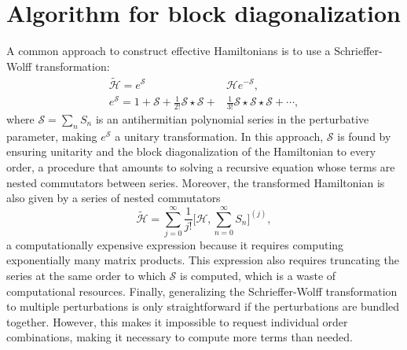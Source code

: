 \section{Algorithm for block diagonalization}

A common approach to construct effective Hamiltonians is to use a
Schrieffer-Wolff transformation:
%
\begin{align}
\tilde{\mathcal{H}} = e^\mathcal{S} &\mathcal{H} e^{-\mathcal{S}}, \\
e^{\mathcal{S}} = 1 + \mathcal{S} + \frac{1}{2!} \mathcal{S} \star \mathcal{S}
+ &\frac{1}{3!} \mathcal{S} \star \mathcal{S} \star \mathcal{S} + \cdots,
\end{align}
%
where $\mathcal{S} = \sum_n S_n$ is an antihermitian polynomial series in the
perturbative parameter, making $e^\mathcal{S}$ a unitary transformation.
In this approach, $\mathcal{S}$ is found by ensuring unitarity and the block
diagonalization of the Hamiltonian to every order, a procedure that amounts to
solving a recursive equation whose terms are nested commutators between series.
Moreover, the transformed Hamiltonian is also given by a series of nested
commutators
%
\begin{equation}
\tilde{\mathcal{H}} = \sum_{j=0}^\infty \frac{1}{j!} \Big [\mathcal{H}, \sum_{n=0}^{\infty} S_n \Big ]^{(j)},
\end{equation}
%
a computationally expensive expression because it requires computing
exponentially many matrix products.
This expression also requires truncating the series at the same order
to which $\mathcal{S}$ is computed, which is a waste of computational resources.
Finally, generalizing the Schrieffer-Wolff transformation to multiple
perturbations is only straightforward if the perturbations are bundled
together.
However, this makes it impossible to request individual order combinations,
making it necessary to compute more terms than needed.

